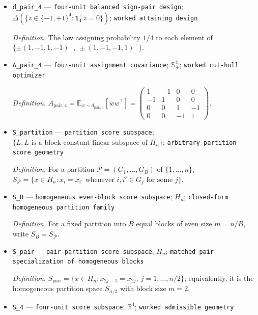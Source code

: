 \documentclass{article}
\begin{document}
\begin{itemize}
  \par\smallskip\noindent\emph{Definition.} \(u_4=2^{-1}(1,1,-1,-1)^\top\).
  \item \texttt{d\_\allowbreak{}pair\_\allowbreak{}4} --- \texttt{four-\allowbreak{}unit balanced sign-\allowbreak{}pair design}; \(\Delta(\{z\in\{-1,+1\}^4:\mathbf 1_4^\top z=0\})\); \texttt{worked attaining design}
  \par\smallskip\noindent\emph{Definition.} The law assigning probability \(1/4\) to each element of \(\{\pm(1,-1,1,-1)^\top,\ \pm(1,-1,-1,1)^\top\}\).
  \item \texttt{A\_\allowbreak{}pair\_\allowbreak{}4} --- \texttt{four-\allowbreak{}unit assignment covariance}; \(\mathbb S_+^4\); \texttt{worked cut-\allowbreak{}hull optimizer}
  \par\smallskip\noindent\emph{Definition.} \(A_{\mathrm{pair},4}=\mathbb E_{w\sim d_{\mathrm{pair},4}}[ww^\top]=\begin{pmatrix}1&-1&0&0\\-1&1&0&0\\0&0&1&-1\\0&0&-1&1\end{pmatrix}\).
  \item \texttt{S\_\allowbreak{}partition} --- \texttt{partition score subspace}; \(\{L:L\text{ is a block-constant linear subspace of }H_n\}\); \texttt{arbitrary partition score geometry}
  \par\smallskip\noindent\emph{Definition.} For a partition \(\mathcal P=(G_1,\ldots,G_B)\) of \(\{1,\ldots,n\}\), \(S_{\mathcal P}=\{x\in H_n:x_i=x_{i'}\text{ whenever }i,i'\in G_j\text{ for some }j\}\).
  \item \texttt{S\_\allowbreak{}B} --- \texttt{homogeneous even-\allowbreak{}block score subspace}; \(H_n\); \texttt{closed-\allowbreak{}form homogeneous partition family}
  \par\smallskip\noindent\emph{Definition.} For a fixed partition into \(B\) equal blocks of even size \(m=n/B\), write \(S_B=S_{\mathcal P}\).
  \item \texttt{S\_\allowbreak{}pair} --- \texttt{pair-\allowbreak{}partition score subspace}; \(H_n\); \texttt{matched-\allowbreak{}pair specialization of homogeneous blocks}
  \par\smallskip\noindent\emph{Definition.} \(S_{\mathrm{pair}}=\{x\in H_n:x_{2j-1}=x_{2j},\ j=1,\ldots,n/2\}\); equivalently, it is the homogeneous partition space \(S_{n/2}\) with block size \(m=2\).
  \item \texttt{S\_\allowbreak{}4} --- \texttt{four-\allowbreak{}unit score subspace}; \(\mathbb R^4\); \texttt{worked admissible geometry}

\end{itemize}
\end{document}
